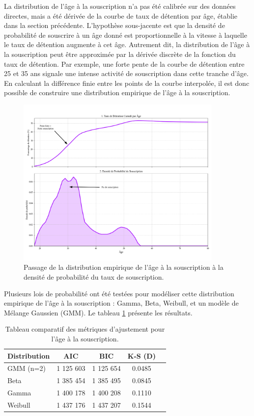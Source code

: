 La distribution de l'âge à la souscription n'a pas été calibrée sur des données directes, mais a été dérivée de la courbe de taux de détention par âge, établie dans la section précédente. L'hypothèse sous-jacente est que la densité de probabilité de souscrire à un âge donné est proportionnelle à la vitesse à laquelle le taux de détention augmente à cet âge. Autrement dit, la distribution de l'âge à la souscription peut être approximée par la dérivée discrète de la fonction du taux de détention. Par exemple, une forte pente de la courbe de détention entre 25 et 35 ans signale une intense activité de souscription dans cette tranche d'âge. En calculant la différence finie entre les points de la courbe interpolée, il est donc possible de construire une distribution empirique de l'âge à la souscription.

\begin{figure}[H]
\centering
\includegraphics[width=0.9\textwidth]{images/2_chapitres/chapitre3/derivation_dist_souscription.png}
\caption{Passage de la distribution empirique de l'âge à la souscription à la densité de probabilité du taux de souscription.}

\end{figure}

Plusieurs lois de probabilité ont été testées pour modéliser cette distribution empirique de l'âge à la souscription : Gamma, Beta, Weibull, et un modèle de Mélange Gaussien (GMM). Le tableau \ref{tab:stats_souscription} présente les résultats.

\begin{table}[H]
\centering
\begin{tabular}{@{}lcccc@{}}
\toprule
\textbf{Distribution} & \textbf{AIC} & \textbf{BIC} & \textbf{K-S (D)} \\
\midrule
GMM (n=2) & 1 125 603 & 1 125 654 & 0.0485 \\
Beta & 1 385 454 & 1 385 495 & 0.0845 \\
Gamma & 1 400 178 & 1 400 208 & 0.1110 \\
Weibull & 1 437 176 & 1 437 207 & 0.1544 \\
\bottomrule
\end{tabular}
\caption{Tableau comparatif des métriques d'ajustement pour l'âge à la souscription.}
\label{tab:stats_souscription}
\end{table}

